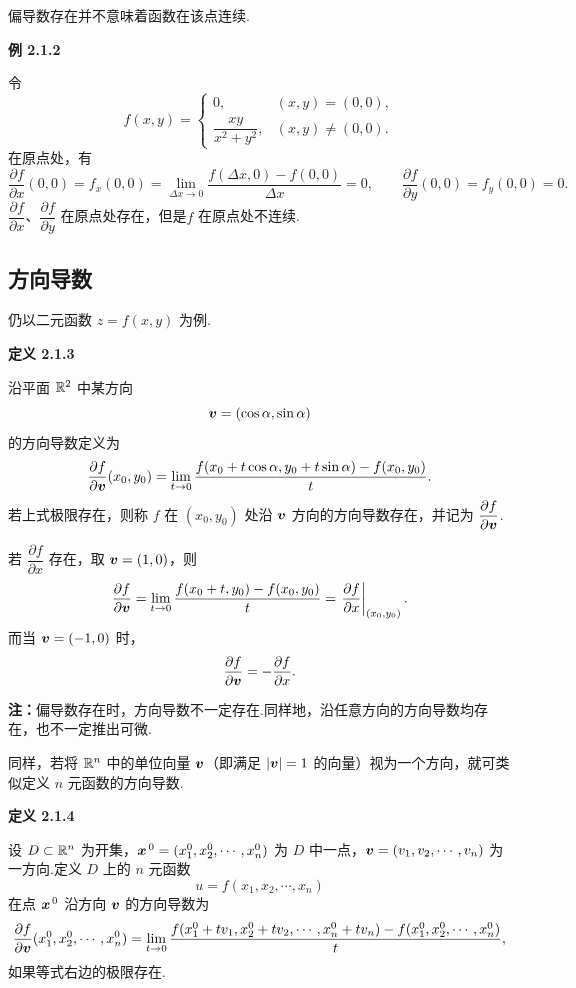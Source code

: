 偏导数存在并不意味着函数在该点连续.



\textbf{例 2.1.2}

令
\[
f(x,y)=
\begin{cases}
0,&(x,y)=(0,0),\\[4pt]
\dfrac{xy}{x^2+y^2},&(x,y)\ne(0,0).
\end{cases}
\]
在原点处，有
\[
\frac{\partial f}{\partial x}(0,0)=f_x(0,0)
=\lim_{\Delta x\to0}\frac{f(\Delta x,0)-f(0,0)}{\Delta x}=0,
\qquad
\frac{\partial f}{\partial y}(0,0)=f_y(0,0)=0.
\]
$\dfrac{\partial f}{\partial x}$、$\dfrac{\partial f}{\partial y}$ 在原点处存在，但是$f$ 在原点处不连续.



\subsection*{方向导数}

仍以二元函数 $z=f(x,y)$ 为例.



\textbf{定义 2.1.3}

沿平面 $\mathbb{R}^2$ 中某方向
\[
\boldsymbol{v}=(\cos\alpha,\sin\alpha)
\]
的方向导数定义为
\[
\frac{\partial f}{\partial\boldsymbol{v}}(x_0,y_0)
=\lim_{t\to0}
\frac{f(x_0+t\cos\alpha,y_0+t\sin\alpha)-f(x_0,y_0)}{t}.
\]
若上式极限存在，则称 $f$ 在 $(x_0,y_0)$ 处沿 $\boldsymbol{v}$ 方向的方向导数存在，并记为 $\dfrac{\partial f}{\partial\boldsymbol{v}}$.




若 $\dfrac{\partial f}{\partial x}$ 存在，取 $\boldsymbol{v}=(1,0)$，则
\[
\frac{\partial f}{\partial\boldsymbol{v}}
=\lim_{t\to0}\frac{f(x_0+t,y_0)-f(x_0,y_0)}{t}
=\left.\frac{\partial f}{\partial x}\right|_{(x_0,y_0)}.
\]
而当 $\boldsymbol{v}=(-1,0)$ 时，
\[
\frac{\partial f}{\partial\boldsymbol{v}}=-\frac{\partial f}{\partial x}.
\]


	\textbf{注：}偏导数存在时，方向导数不一定存在.同样地，沿任意方向的方向导数均存在，也不一定推出可微.


同样，若将 $\mathbb{R}^n$ 中的单位向量 $\boldsymbol{v}$（即满足 $|\boldsymbol{v}|=1$ 的向量）视为一个方向，就可类似定义 $n$ 元函数的方向导数.



\textbf{定义 2.1.4}

设 $D\subset\mathbb{R}^n$ 为开集，$\boldsymbol{x}^{\,0}=(x_1^0,x_2^0,\cdots,x_n^0)$ 为 $D$ 中一点，$\boldsymbol{v}=(v_1,v_2,\cdots,v_n)$ 为一方向.定义 $D$ 上的 $n$ 元函数
	\[
	u=f(x_1,x_2,\cdots,x_n)
	\]
	在点 $\boldsymbol{x}^{\,0}$ 沿方向 $\boldsymbol{v}$ 的方向导数为
	\[
	\frac{\partial f}{\partial\boldsymbol{v}}(x_1^0,x_2^0,\cdots,x_n^0)
	=\lim_{t\to0}
	\frac{f(x_1^0+tv_1,x_2^0+tv_2,\cdots,x_n^0+tv_n)-f(x_1^0,x_2^0,\cdots,x_n^0)}{t},
	\]
	如果等式右边的极限存在.




